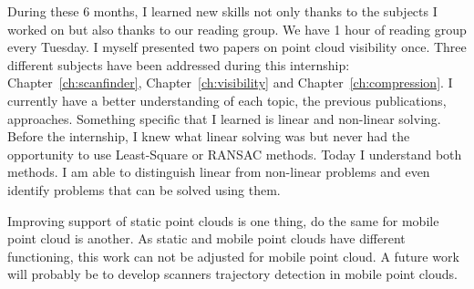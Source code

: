 During these 6 months, I learned new skills not only thanks to the subjects I worked on but also thanks to our reading group. We have 1 hour of reading group every Tuesday. I myself presented two papers on point cloud visibility once. Three different subjects have been addressed during this internship: Chapter~\ref{ch:scanfinder}, Chapter~\ref{ch:visibility} and Chapter~\ref{ch:compression}. I currently have a better understanding of each topic, the previous publications,
approaches. Something specific that I learned is linear and non-linear solving. Before the internship, I knew what linear solving was but never had the opportunity to use Least-Square or RANSAC methods. Today I understand both methods. I am able to distinguish linear from non-linear problems and even identify problems that can be solved using them.

Improving support of static point clouds is one thing, do the same for mobile point cloud is another. As static and mobile point clouds have different functioning, this work can not be adjusted for mobile point cloud. A future work will probably be to develop scanners trajectory detection in mobile point clouds.
